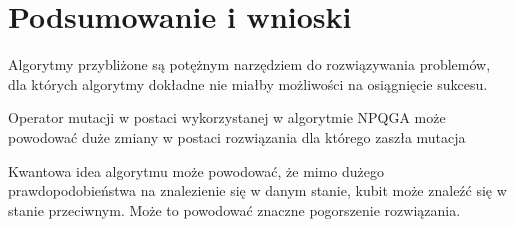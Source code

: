 \chapter{Podsumowanie i wnioski}
\label{cha:wnioski}

Algorytmy przybliżone są potężnym narzędziem do rozwiązywania problemów, dla których algorytmy dokładne nie miałby możliwości na osiągnięcie sukcesu.

Operator mutacji w postaci wykorzystanej w algorytmie NPQGA może powodować duże zmiany w postaci rozwiązania dla którego zaszła mutacja

Kwantowa idea algorytmu może powodować, że mimo dużego prawdopodobieństwa na znalezienie się w danym stanie, kubit może znaleźć się w stanie przeciwnym. Może to powodować znaczne pogorszenie rozwiązania.